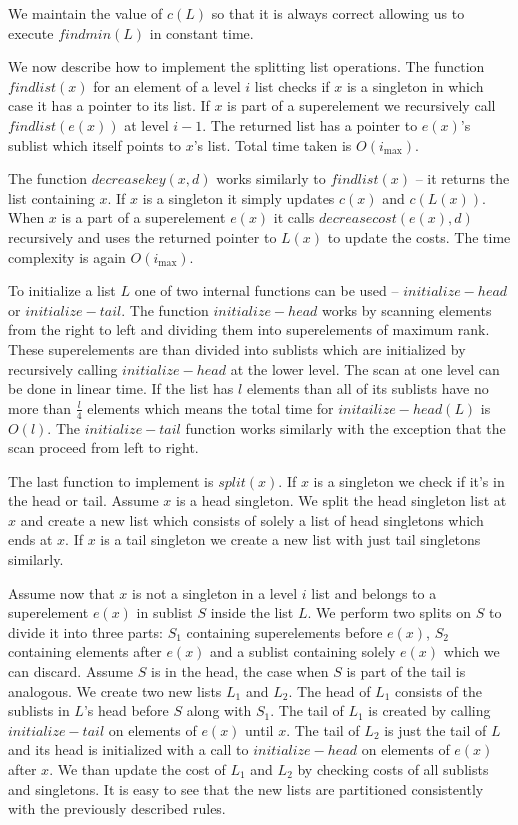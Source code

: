 We maintain the value of $c(L)$ so that it is always correct allowing us to execute $findmin(L)$ in constant time.

We now describe how to implement the splitting list operations. The function $findlist(x)$ for an element of a level $i$ list checks if $x$ is a singleton in which case it has a pointer to its list. If $x$ is part of a superelement we recursively call $findlist(e(x))$ at level $i-1$. The returned list has a pointer to $e(x)$'s sublist which itself points to $x$'s list. Total time taken is $O(i_{\max})$.

The function $decreasekey(x, d)$ works similarly to $findlist(x)$ – it returns the list containing $x$. If $x$ is a singleton it simply updates $c(x)$ and $c(L(x))$. When $x$ is a part of a superelement $e(x)$ it calls $decreasecost(e(x), d)$ recursively and uses the returned pointer to $L(x)$ to update the costs. The time complexity is again $O(i_{\max})$.

To initialize a list $L$ one of two internal functions can be used – $initialize-head$ or $initialize-tail$. The function $initialize-head$ works by scanning elements from the right to left and dividing them into superelements of maximum rank. These superelements are than divided into sublists which are initialized by recursively calling $initialize-head$ at the lower level. The scan at one level can be done in linear time. If the list has $l$ elements than all of its sublists have no more than $\frac{l}{4}$ elements which means the total time for $initailize-head(L)$ is $O(l)$. The $initialize-tail$ function works similarly with the exception that the scan proceed from left to right.

The last function to implement is $split(x)$. If $x$ is a singleton we check if it's in the head or tail. Assume $x$ is a head singleton. We split the head singleton list at $x$ and create a new list which consists of solely a list of head singletons which ends at $x$. If $x$ is a tail singleton we create a new list with just tail singletons similarly.

Assume now that $x$ is not a singleton in a level $i$ list and belongs to a superelement $e(x)$ in sublist $S$ inside the list $L$. We perform two splits on $S$ to divide it into three parts: $S_1$ containing superelements before $e(x)$, $S_2$ containing elements after $e(x)$ and a sublist containing solely $e(x)$ which we can discard. Assume $S$ is in the head, the case when $S$ is part of the tail is analogous. We create two new lists $L_1$ and $L_2$. The head of $L_1$ consists of the sublists in $L$'s head before $S$ along with $S_1$. The tail of $L_1$ is created by calling $initialize-tail$ on elements of $e(x)$ until $x$. The tail of $L_2$ is just the tail of $L$ and its head is initialized with a call to $initialize-head$ on elements of $e(x)$ after $x$. We than update the cost of $L_1$ and $L_2$ by checking costs of all sublists and singletons. It is easy to see that the new lists are partitioned consistently with the previously described rules.

